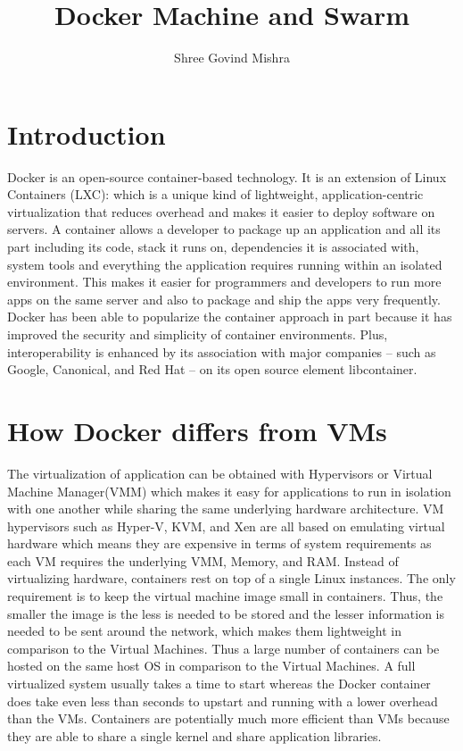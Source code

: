 \documentclass[9pt,twocolumn,twoside]{styles/osajnl}
\title{Docker Machine and Swarm}
\author[1]{Shree Govind Mishra}
\affil[1]{School of Informatics and Computing, Bloomington, IN 47408, U.S.A.}
\affil[*]{Corresponding authors:shremish@indiana.edu}
\begin{document}
\maketitle


\section{Introduction}
Docker is an open-source container-based technology. It is an
extension of Linux Containers (LXC): which is a unique kind of
lightweight, application-centric virtualization that reduces overhead
and makes it easier to deploy software on
servers\cite{www-docker-2}. A container allows a developer to package
up an application and all its part including its code, stack it runs
on, dependencies it is associated with, system tools and everything
the application requires running  within an isolated environment. This
makes it easier for programmers and developers to run more apps on the
same server and also to package and ship the apps very frequently.
Docker has been able to popularize the container approach in part
because it has improved the security and simplicity of container
environments. Plus, interoperability is enhanced by its association
with major companies – such as Google, Canonical, and Red Hat – on its
open source element libcontainer.

\section{How Docker differs from VMs}

The virtualization of application can be obtained with Hypervisors or
Virtual Machine Manager(VMM) which makes it easy for applications to
run in isolation with one another while sharing the same
underlying hardware architecture. VM hypervisors such as Hyper-V, KVM,
and Xen are all based on emulating virtual hardware which means they
are expensive in terms of system requirements as each VM requires the
underlying VMM, Memory, and RAM. Instead of virtualizing hardware,
containers rest on top of a single Linux instances. The only
requirement is to keep the virtual machine image small in containers.
Thus, the smaller the image is the less is needed to be stored and the
lesser information is needed to be sent around the network, which
makes them lightweight in comparison to the Virtual Machines. Thus a
large number of containers can be hosted on the same host OS in
comparison to the Virtual Machines. A full virtualized system usually
takes a time to start whereas the Docker container does take even less
than seconds to upstart and running with a lower overhead than the
VMs\cite{www-stackoverflow-docker}.  Containers are potentially much
more efficient than VMs because they are able to share a single kernel
and share application libraries.
\end{document}
